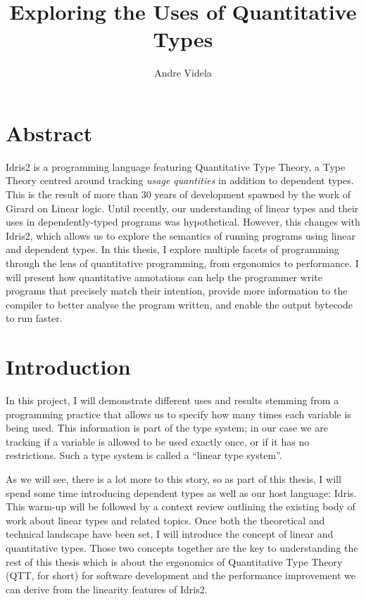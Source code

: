 \documentclass[
]{article}
\author{}
\date{}
\begin{document}
\title{Exploring the Uses of Quantitative Types}
\author{Andre Videla}
\maketitle

\hypertarget{abstract}{%
\section{Abstract}\label{abstract}}

Idris2 is a programming language featuring Quantitative Type Theory, a
Type Theory centred around tracking \emph{usage quantities} in addition
to dependent types. This is the result of more than 30 years of
development spawned by the work of Girard on Linear logic. Until
recently, our understanding of linear types and their uses in
dependently-typed programs was hypothetical. However, this changes with
Idris2, which allows us to explore the semantics of running programs
using linear and dependent types. In this thesis, I explore multiple
facets of programming through the lens of quantitative programming, from
ergonomics to performance. I will present how quantitative annotations
can help the programmer write programs that precisely match their
intention, provide more information to the compiler to better analyse
the program written, and enable the output bytecode to run faster.

\newpage
\setcounter{tocdepth}{2}
\setcounter{secnumdepth}{2}
\tableofcontents
\newpage

\hypertarget{introduction}{%
\section{Introduction}\label{introduction}}

In this project, I will demonstrate different uses and results stemming
from a programming practice that allows us to specify how many times
each variable is being used. This information is part of the type
system; in our case we are tracking if a variable is allowed to be used
exactly once, or if it has no restrictions. Such a type system is called
a ``linear type system''.

As we will see, there is a lot more to this story, so as part of this
thesis, I will spend some time introducing dependent types as well as
our host language: Idris. This warm-up will be followed by a context
review outlining the existing body of work about linear types and
related topics. Once both the theoretical and technical landscape have
been set, I will introduce the concept of linear and quantitative types.
Those two concepts together are the key to understanding the rest of
this thesis which is about the ergonomics of Quantitative Type Theory
\cite{qtt}\cite{nuttin} (QTT, for short) for software development and
the performance improvement we can derive from the linearity features of
Idris2.
\end{document}
